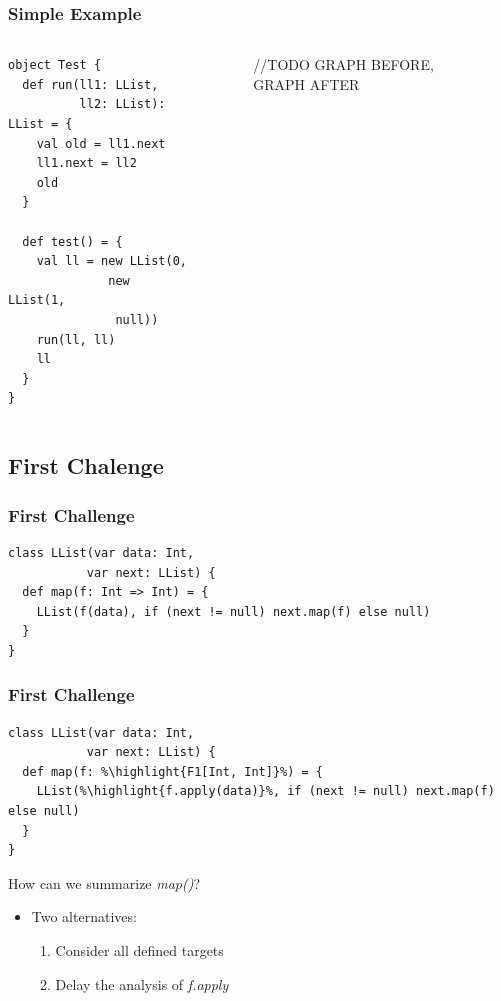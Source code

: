 \documentclass[hyperref={pdfpagelabels=false}]{beamer}
\newcommand\highlight[1]{\color{red}{#1}}
\begin{document}
\begin{frame}[fragile]
\frametitle{Simple Example}
  \begin{columns}
    \begin{column}{0.4\textwidth}
\begin{lstlisting}
object Test {
  def run(ll1: LList,
          ll2: LList): LList = {
    val old = ll1.next
    ll1.next = ll2
    old
  }

  def test() = {
    val ll = new LList(0,
              new LList(1,
               null))
    run(ll, ll)
    ll
  }
}
\end{lstlisting}
    \end{column}
    \begin{column}{0.6\textwidth}
      \begin{figure}[t]
        //TODO GRAPH BEFORE, GRAPH AFTER
      \end{figure}
    \end{column}
  \end{columns}
\end{frame}

\subsection{First Chalenge}

\begin{frame}[fragile]
\frametitle{First Challenge}
\begin{lstlisting}
class LList(var data: Int,
           var next: LList) {
  def map(f: Int => Int) = {
    LList(f(data), if (next != null) next.map(f) else null)
  }
}
\end{lstlisting}
\end{frame}

\begin{frame}[fragile]
\frametitle{First Challenge}
\begin{lstlisting}[escapechar=\%]
class LList(var data: Int,
           var next: LList) {
  def map(f: %\highlight{F1[Int, Int]}%) = {
    LList(%\highlight{f.apply(data)}%, if (next != null) next.map(f) else null)
  }
}
\end{lstlisting}

    \vspace{10pt}
    How can we summarize \emph{map()}?

    \pause
    \begin{itemize}
        \item Two alternatives:
        \begin{enumerate}
            \item Consider all defined targets
            \item Delay the analysis of \emph{f.apply}
        \end{enumerate}
    \end{itemize}
\end{frame}
\end{document}
